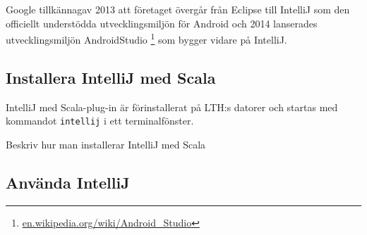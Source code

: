 Google tillkännagav 2013 att företaget övergår från Eclipse till IntelliJ som den officiellt understödda utvecklingsmiljön för Android och 2014 lanserades utvecklingsmiljön AndroidStudio%
\footnote {\href{https://en.wikipedia.org/wiki/Android_Studio}{en.wikipedia.org/wiki/Android\_Studio}}
 som bygger vidare på IntelliJ. 

\subsection{Installera IntelliJ med Scala}\label{appendix:ide:intellij:install}

IntelliJ med Scala-plug-in är förinstallerat på LTH:s datorer och startas med kommandot \texttt{intellij} i ett terminalfönster.

\TODO Beskriv hur man installerar IntelliJ med Scala

\subsection{Använda IntelliJ}\label{appendix:ide:intellij:use}

\TODO 
